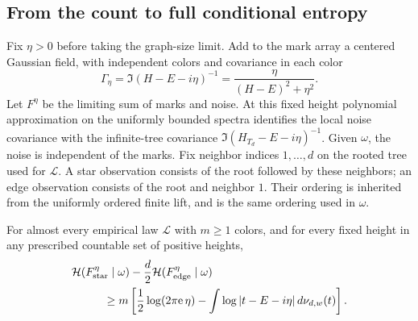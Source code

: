 \subsection{From the count to full conditional entropy}

Fix \(\eta>0\) before taking the graph-size limit.  Add to the mark
array a centered Gaussian field, with independent colors and
covariance in each color
\begin{equation}\label{eq:entropy-smoothing}
 \Gamma_\eta=\Im(H-E-i\eta)^{-1}
     =\frac{\eta}{(H-E)^2+\eta^2}.
\end{equation}
Let \(F^\eta\) be the limiting sum of marks and noise.  At this fixed
height polynomial approximation on the uniformly bounded spectra
identifies the local noise covariance with the infinite-tree
covariance \(\Im(H_{T_d}-E-i\eta)^{-1}\).  Given \(\omega\), the
noise is independent of the marks.  Fix neighbor indices
\(1,\ldots,d\) on the rooted tree used for \(\mathcal L\).  A star
observation consists of the root followed by these neighbors; an
edge observation consists of the root and neighbor \(1\).  Their
ordering is inherited from the uniformly ordered finite lift,
and is the same ordering used in \(\omega\).

\begin{proposition}
\label{prop:conditional-entropy}
For almost every empirical law \(\mathcal L\) with \(m\ge1\) colors,
and for every fixed height in any prescribed countable set of
positive heights,
\begin{equation}\label{eq:conditional-star-edge-entropy}
 \begin{split}
 &\mathcal H(F^\eta_{\rm star}\mid\omega)
       -\frac d2\mathcal H(F^\eta_{\rm edge}\mid\omega)\\
 &\hspace{1cm}\ge
 m\left[\frac12\log(2\pi\mathrm e\,\eta)
       -\int\log|t-E-i\eta|\,d\nu_{d,w}(t)\right].
 \end{split}
\end{equation}
\end{proposition}

